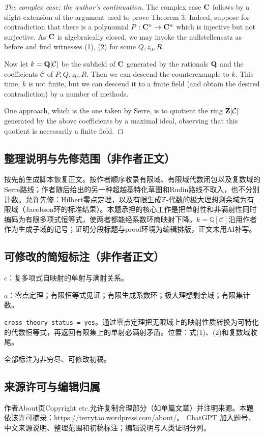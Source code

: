 \documentclass[UTF8,11pt]{ctexart}
\theoremstyle{definition}
\newcommand{\Z}{\mathbb Z}
\newcommand{\Q}{\mathbb Q}
\begin{document}
\begin{proof}[The complex case; the author's continuation]
The complex case ${\bf C}$ follows by a slight extension of the argument used to prove Theorem 3. Indeed, suppose for contradiction that there is a polynomial $P:{\bf C}^n\to{\bf C}^n$ which is injective but not surjective. As ${\bf C}$ is algebraically closed, we may invoke the nullstellensatz as before and find witnesses (1), (2) for some $Q,z_0,R$.

Now let $k={\bf Q}[\mathcal C]$ be the subfield of ${\bf C}$ generated by the rationals ${\bf Q}$ and the coefficients $\mathcal C$ of $P,Q,z_0,R$. Then we can descend the counterexample to $k$. This time, $k$ is not finite, but we can descend it to a finite field (and obtain the desired contradiction) by a number of methods.

One approach, which is the one taken by Serre, is to quotient the ring ${\bf Z}[\mathcal C]$ generated by the above coefficients by a maximal ideal, observing that this quotient is necessarily a finite field.
\end{proof}

\subsection*{整理说明与先修范围（非作者正文）}
按先前生成脚本恢复正文。按作者顺序收录有限域、有限域代数闭包以及复数域的Serre路线；作者随后给出的另一种超越基特化草图和Rudin路线不取入，也不分别计数。允许先修：Hilbert零点定理，以及有限生成$\Z$-代数的极大理想剩余域为有限域（Jacobson环的标准结果）。本题承担的核心工作是把单射性和非满射性同时编码为有限多项式恒等式，使两者都能经系数环商映射下降。$k=\Q[\mathcal C]$沿用作者作为生成子域的记号；证明分段标题与proof环境为编辑排版，正文未用AI补写。
\subsection*{可修改的简短标注（非作者正文）}
$c$：复多项式自映射的单射与满射关系。

$a$：零点定理；有限恒等式见证；有限生成系数环；极大理想剩余域；有限集计数。

\texttt{cross\_theory\_status = yes}。通过零点定理把无限域上的映射性质转换为可特化的代数恒等式，再返回有限集上的单射必满射矛盾。位置：式(1)、(2)和复数域收尾。

全部标注为非穷尽、可修改初稿。
\subsection*{来源许可与编辑归属}
作者About页Copyright etc.允许复制合理部分（如单篇文章）并注明来源。本题依该许可摘录：\url{https://terrytao.wordpress.com/about/}。
ChatGPT 加入题号、中文来源说明、整理范围和初稿标注；编辑说明与人类证明分列。
\end{document}
